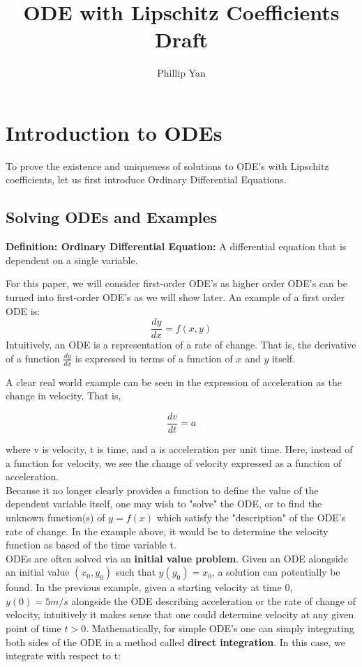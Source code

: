 \documentclass{article}
\date{}
\title{ODE with Lipschitz Coefficients Draft}
\author{Phillip Yan} %
\begin{document}
\maketitle



\section{Introduction to ODEs}
To prove the existence and uniqueness of solutions to ODE's with Lipschitz coefficients, let us first introduce Ordinary Differential Equations. \\

\subsection{Solving ODEs and Examples}
\textbf{Definition: Ordinary Differential Equation:} A differential equation that is dependent on a single variable.

For this paper, we  will consider first-order ODE's as higher order ODE's can be turned into first-order ODE's as we will show later. An example of a first order ODE is:
$$\frac{dy}{dx} = f(x,y)$$
Intuitively, an ODE is a representation of a rate of change.
That is, the derivative of a function $\frac{dy}{dx}$ is expressed in terms of a function of $x$ and $y$ itself. 



A clear real world example can be seen in the expression of acceleration as the change in velocity. That is, 

$$\frac{dv}{dt} = a$$

where v is velocity, t is time, and a is acceleration per unit time. Here, instead of a function for velocity, we see the change of velocity expressed as a function of acceleration. \\

Because it no longer clearly provides a function to define the value of the dependent variable itself, one may wish to "solve" the ODE, or to find the unknown function(s) of $y=f(x)$ which satisfy the "description" of the ODE's rate of change. In the example above, it would be to determine the velocity function as based of the time variable t. \\

ODEs are often solved via an \textbf{initial value problem}. Given an ODE alongside an initial value $(x_0, y_0)$ such that $y(y_0) = x_0$, a solution can potentially be found. In the previous example, given a starting velocity at time 0, $y(0) = 5m/s$ alongside the ODE describing acceleration or the rate of change of velocity, intuitively it makes sense that one could determine velocity at any given point of time $t>0$. Mathematically, for simple ODE's one can simply integrating both sides of the ODE in a method called \textbf{direct integration}. In this case, we integrate with respect to t:
\end{document}

